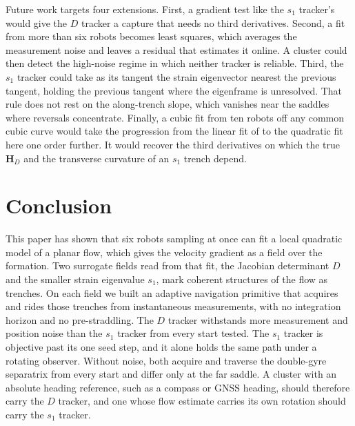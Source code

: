 \documentclass[lettersize,journal]{IEEEtran}
\begin{document}
Future work targets four extensions. First, a gradient test like the
$s_1$ tracker's would give the $D$ tracker a capture that needs no third
derivatives. Second, a fit from more than six robots becomes least squares,
which averages the measurement noise and leaves a residual that estimates
it online. A cluster could then detect the high-noise regime in which neither
tracker is reliable. Third, the
$s_1$ tracker could take as its tangent the strain eigenvector nearest the
previous tangent, holding the previous tangent where the eigenframe is
unresolved. That rule does not rest on the along-trench slope, which
vanishes near the saddles where reversals concentrate. Finally, a cubic fit
from ten robots off any common cubic curve would take the progression from
the linear fit of \cite{10} to the quadratic fit here one order further. It
would recover the third derivatives on which the true $\mathbf{H}_D$ and
the transverse curvature of an $s_1$ trench depend.

\section{Conclusion}

This paper has shown that six robots sampling at once can fit a local
quadratic model of a planar flow, which gives the velocity gradient as a
field over the formation. Two surrogate fields read from that fit, the
Jacobian determinant $D$ and the smaller strain eigenvalue $s_1$, mark
coherent structures of the flow as trenches. On each field we built an
adaptive navigation primitive that acquires and rides those trenches from
instantaneous measurements, with no integration horizon and no
pre-straddling. The $D$ tracker withstands more measurement and position
noise than the $s_1$ tracker from every start tested. The $s_1$ tracker is
objective past its one seed step, and it alone holds the same path under a
rotating observer. Without noise, both acquire and traverse the
double-gyre separatrix from every start and differ only at the far saddle.
A cluster with an absolute heading reference, such as a compass or GNSS
heading, should therefore carry the $D$ tracker, and one whose flow
estimate carries its own rotation should carry the $s_1$ tracker.
\end{document}
